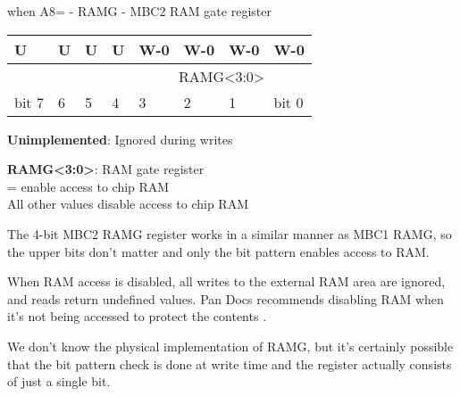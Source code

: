 \documentclass[\main/gbctr.tex]{subfiles}
\begin{document}
\begin{register}[H]
  \caption{ when A8= - RAMG - MBC2 RAM gate register}
  {
    \ttfamily
    \begin{tabularx}{\linewidth}{|X|X|X|X|X|X|X|X|}
      \hline
      U & U & U & U & W-0 & W-0 & W-0 & W-0 \\
      \hline
      \cellcolor{LightGray} & \cellcolor{LightGray} & \cellcolor{LightGray} & \cellcolor{LightGray} & \multicolumn{4}{c|}{RAMG<3:0>} \\
      \hline
      bit 7 & 6 & 5 & 4 & 3 & 2 & 1 & bit 0 \\
      \hline
    \end{tabularx}{\parfillskip=0pt\par}
  }

  \begin{description}[leftmargin=5em, style=nextline]
    \item[bit 7-4]
      \textbf{Unimplemented}: Ignored during writes
    \item[bit 3-0]
      \textbf{RAMG<3:0>}: RAM gate register\\
      = enable access to chip RAM\\
      All other values disable access to chip RAM
  \end{description}
\end{register}

The 4-bit MBC2 RAMG register works in a similar manner as MBC1 RAMG, so the
upper bits don't matter and only the bit pattern  enables access to
RAM.

When RAM access is disabled, all writes to the external RAM area
 are ignored, and reads return undefined values. Pan Docs
recommends disabling RAM when it's not being accessed to protect the contents
\cite{pandocs}.

\begin{speculation}
  We don't know the physical implementation of RAMG, but it's certainly
  possible that the  bit pattern check is done at write time and the
  register actually consists of just a single bit.
\end{speculation}
\end{document}
